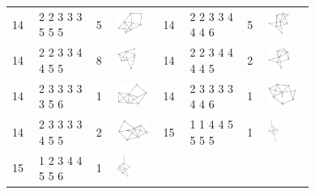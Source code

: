\begin{footnotesize}
\begin{longtable}{
        m{0.05\linewidth} m{0.15\linewidth} m{0.05\linewidth} m{0.12\linewidth} |
        m{0.05\linewidth} m{0.15\linewidth} m{0.05\linewidth} m{0.12\linewidth}
    }
14 & 2 2 3 3 3 5 5 5 & 5 & \includegraphics[height=0.7151cm]{15-universal-graphs/img/degree-sequences-example-graphs/graph-4-8-88} &
14 & 2 2 3 3 4 4 4 6 & 5 & \includegraphics[height=0.7151cm]{15-universal-graphs/img/degree-sequences-example-graphs/graph-4-8-89}\\
14 & 2 2 3 3 4 4 5 5 & 8 & \includegraphics[height=0.7151cm]{15-universal-graphs/img/degree-sequences-example-graphs/graph-4-8-90} &
14 & 2 2 3 4 4 4 4 5 & 2 & \includegraphics[height=0.7151cm]{15-universal-graphs/img/degree-sequences-example-graphs/graph-4-8-91}\\
14 & 2 3 3 3 3 3 5 6 & 1 & \includegraphics[height=0.7151cm]{15-universal-graphs/img/degree-sequences-example-graphs/graph-4-8-92} &
14 & 2 3 3 3 3 4 4 6 & 1 & \includegraphics[height=0.7151cm]{15-universal-graphs/img/degree-sequences-example-graphs/graph-4-8-93}\\
14 & 2 3 3 3 3 4 5 5 & 2 & \includegraphics[height=0.7151cm]{15-universal-graphs/img/degree-sequences-example-graphs/graph-4-8-94} &
15 & 1 1 4 4 5 5 5 5 & 1 & \includegraphics[height=0.7151cm]{15-universal-graphs/img/degree-sequences-example-graphs/graph-4-8-95}\\
15 & 1 2 3 4 4 5 5 6 & 1 & \includegraphics[height=0.7151cm]{15-universal-graphs/img/degree-sequences-example-graphs/graph-4-8-96} &

\end{longtable}
\end{footnotesize}

